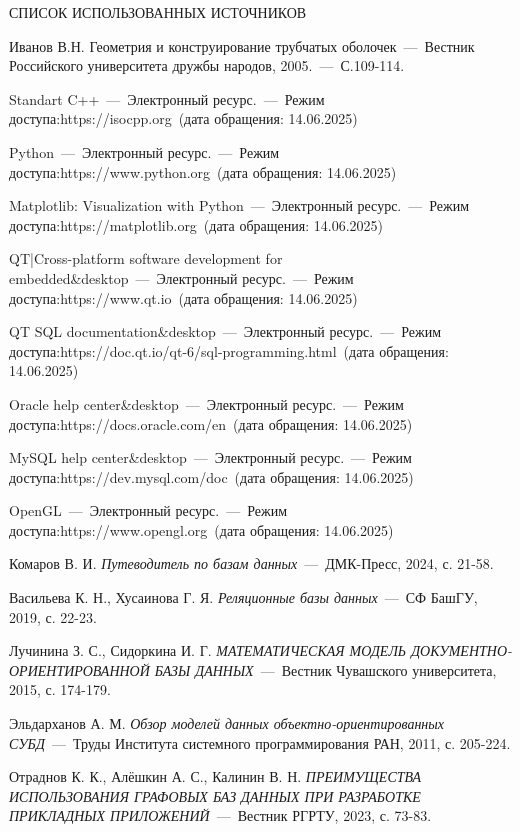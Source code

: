 \begin{center}
    \MakeUppercase{\large СПИСОК ИСПОЛЬЗОВАННЫХ ИСТОЧНИКОВ}
\end{center}

\renewcommand{\refname}{} %
\vspace{-11mm}

\begin{thebibliography}{9}

Иванов В.Н. Геометрия и конструирование трубчатых оболочек~---~Вестник Российского университета дружбы народов, 2005.~---~С.109-114.

Standart C++~---~Электронный ресурс.~---~Режим доступа:https://isocpp.org~(дата обращения: 14.06.2025)

Python~---~Электронный ресурс.~---~Режим доступа:https://www.python.org~(дата обращения: 14.06.2025)

Matplotlib: Visualization with Python~---~Электронный ресурс.~---~Режим доступа:https://matplotlib.org~(дата обращения: 14.06.2025)
    
QT|Cross-platform software development for embedded\&desktop~---~Электронный ресурс.~---~Режим доступа:https://www.qt.io~(дата обращения: 14.06.2025)

QT SQL documentation\&desktop~---~Электронный ресурс.~---~Режим доступа:https://doc.qt.io/qt-6/sql-programming.html~(дата обращения: 14.06.2025)

Oracle help center\&desktop~---~Электронный ресурс.~---~Режим доступа:https://docs.oracle.com/en~(дата обращения: 14.06.2025)

MySQL help center\&desktop~---~Электронный ресурс.~---~Режим доступа:https://dev.mysql.com/doc~(дата обращения: 14.06.2025)

OpenGL~---~Электронный ресурс.~---~Режим доступа:https://www.opengl.org~(дата обращения: 14.06.2025)
    
     Комаров В. И. \textit{Путеводитель по базам данных}~---~ДМК-Пресс, 2024, с. 21-58.
    
     Васильева К. Н., Хусаинова Г. Я. \textit{Реляционные базы данных}~---~СФ БашГУ, 2019, с. 22-23.
    
     Лучинина З. С., Сидоркина И. Г. \textit{МАТЕМАТИЧЕСКАЯ МОДЕЛЬ ДОКУМЕНТНО-ОРИЕНТИРОВАННОЙ БАЗЫ ДАННЫХ}~---~Вестник Чувашского университета, 2015, с. 174-179.
    
     Эльдарханов А. М. \textit{Обзор моделей данных объектно-ориентированных СУБД}~---~Труды Института системного программирования РАН, 2011, с. 205-224.
    
     Отраднов К. К., Алёшкин А. С., Калинин В. Н. \textit{ПРЕИМУЩЕСТВА ИСПОЛЬЗОВАНИЯ ГРАФОВЫХ БАЗ ДАННЫХ ПРИ РАЗРАБОТКЕ ПРИКЛАДНЫХ ПРИЛОЖЕНИЙ}~---~Вестник РГРТУ, 2023, с. 73-83.
    
\end{thebibliography}
